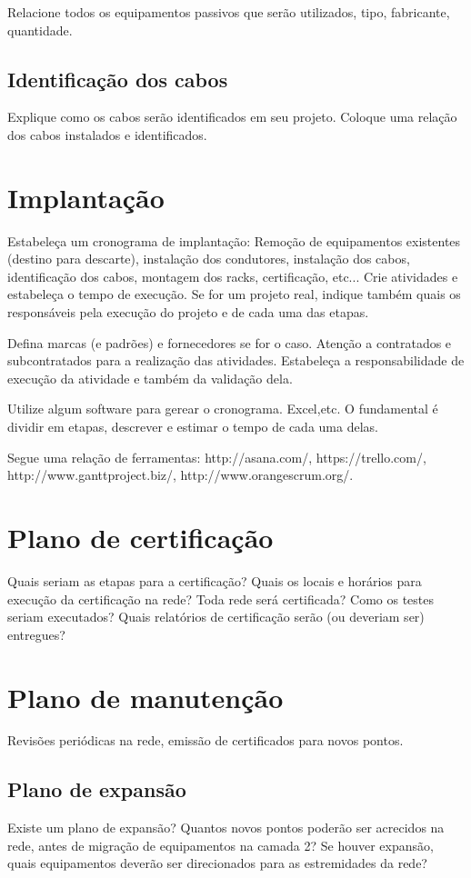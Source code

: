 \documentclass[	DIV=calc,%
paper=a4,%
fontsize=12pt,%
onecolumn]{scrartcl}	 					%
\begin{document}
	Relacione todos os equipamentos passivos que serão utilizados, tipo, fabricante, quantidade.
	
	\subsection{Identificação dos cabos}
	Explique como os cabos serão identificados em seu projeto. Coloque uma relação dos cabos instalados e identificados.
	
	\section{Implantação}
	Estabeleça um cronograma de implantação:
	Remoção de equipamentos existentes (destino para descarte), instalação dos condutores, instalação dos cabos, 
	identificação dos cabos, montagem dos racks, certificação, etc... Crie atividades e estabeleça o tempo de execução. Se for um projeto real, indique também quais os responsáveis pela execução do projeto e de cada uma das etapas.
	
	Defina marcas (e padrões) e fornecedores se for o caso. Atenção a contratados e subcontratados para a realização das atividades. Estabeleça a responsabilidade de execução da atividade e também da validação dela.
	
	Utilize algum software para gerear o cronograma. Excel,etc. O fundamental é dividir em etapas, descrever e estimar o tempo de cada uma delas.
	
	Segue uma relação de ferramentas:
	http://asana.com/, 
	https://trello.com/, 
	http://www.ganttproject.biz/, 
	http://www.orangescrum.org/. 
	
	\section{Plano de certificação}
	Quais seriam as etapas para a certificação? 
	Quais os locais e horários para execução da certificação na rede? Toda rede será certificada?
	Como os testes seriam executados?
	Quais relatórios de certificação serão (ou deveriam ser) entregues? 
	
	\section{Plano de manutenção}
	
	Revisões periódicas na rede, emissão de certificados para novos pontos.
	
	\subsection{Plano de expansão}
	Existe um plano de expansão? Quantos novos pontos poderão ser acrecidos na rede, antes de migração de equipamentos na camada 2? Se houver expansão, quais equipamentos deverão ser direcionados para as estremidades da rede? 
	
\end{document}
